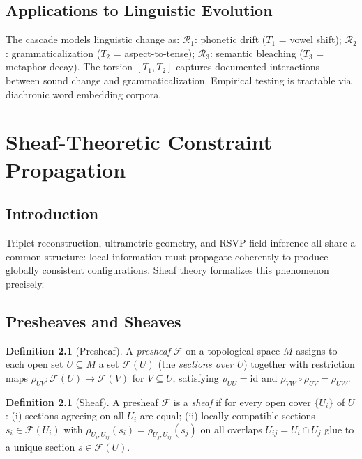 \documentclass[12pt,a4paper,oneside]{book}
\numberwithin{equation}{chapter}
\theoremstyle{plain}
\theoremstyle{definition}
\newtheorem{definition}[theorem]{Definition}
\theoremstyle{remark}
\begin{document}
\section{Applications to Linguistic Evolution}

The cascade models linguistic change as:
$\mathcal{R}_1$: phonetic drift ($T_1$ = vowel shift);
$\mathcal{R}_2$: grammaticalization ($T_2$ = aspect-to-tense);
$\mathcal{R}_3$: semantic bleaching ($T_3$ = metaphor decay).
The torsion $[T_1,T_2]$ captures documented interactions between
sound change and grammaticalization. Empirical testing is tractable
via diachronic word embedding corpora.


\chapter{Sheaf-Theoretic Constraint Propagation}
\label{ch:sheaf-constraints}

\section{Introduction}

Triplet reconstruction, ultrametric geometry, and RSVP field
inference all share a common structure: local information must
propagate coherently to produce globally consistent configurations.
Sheaf theory formalizes this phenomenon precisely.

\section{Presheaves and Sheaves}

\begin{definition}[Presheaf]
A \emph{presheaf} $\mathcal{F}$ on a topological space $M$ assigns
to each open set $U \subseteq M$ a set $\mathcal{F}(U)$ (the
\emph{sections over $U$}) together with restriction maps
$\rho_{UV} : \mathcal{F}(U) \rightarrow \mathcal{F}(V)$ for
$V \subseteq U$, satisfying $\rho_{UU} = \mathrm{id}$ and
$\rho_{VW} \circ \rho_{UV} = \rho_{UW}$.
\end{definition}

\begin{definition}[Sheaf]
A presheaf $\mathcal{F}$ is a \emph{sheaf} if for every open cover
$\{U_i\}$ of $U$: (i) sections agreeing on all $U_i$ are equal;
(ii) locally compatible sections $s_i \in \mathcal{F}(U_i)$ with
$\rho_{U_i,U_{ij}}(s_i) = \rho_{U_j,U_{ij}}(s_j)$ on all overlaps
$U_{ij} = U_i \cap U_j$ glue to a unique section $s \in
\mathcal{F}(U)$.
\end{definition}
\end{document}
